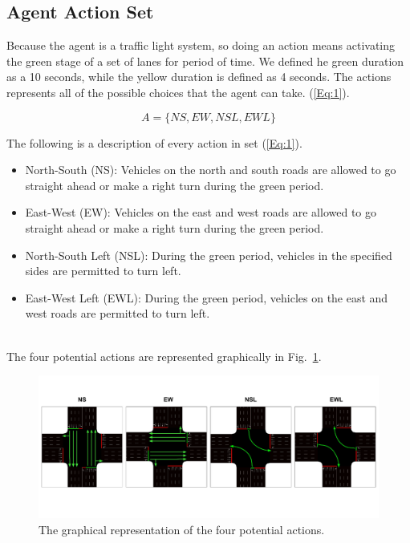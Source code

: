 \documentclass[conference]{IEEEtran}
\begin{document}
\subsection{Agent Action Set}

Because the agent is a traffic light system, so doing an action means activating the green stage of a set of lanes for period of time. We defined he green duration as a 10 seconds, while the yellow duration is defined as 4 seconds. The actions represents all of the possible choices that the agent can take. (\ref{Eq:1}).

\begin{equation}\label{Eq:1}
    A = \{NS, EW, NSL, EWL\}
\end{equation}

The following is a description of every action in set (\ref{Eq:1}).

\begin{itemize}
    \item North-South (NS): Vehicles on the north and south roads are allowed to go straight ahead or make a right turn during the green period.
    \item East-West (EW): Vehicles on the east and west roads are allowed to go straight ahead or make a right turn during the green period.
    \item  North-South Left (NSL): During the green period, vehicles in the specified sides are permitted to turn left.
    \item  East-West Left (EWL): During the green period, vehicles on the east and west roads are permitted to turn left.
\end{itemize}\leavevmode\\

The four potential actions are represented graphically in Fig.~\ref{fig:4}.

\begin{figure}[H]
    \centering
    \begin{center}
    \includegraphics[scale=0.27]{images/Possible actions.pdf}
    \end{center}
    \caption{The graphical representation of the four potential actions.}
    \label{fig:4}
\end{figure}
\end{document}
